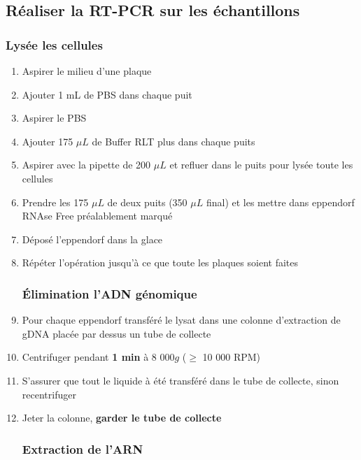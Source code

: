 \subsection{Réaliser la RT-PCR sur les échantillons}

\textbf{\color{red}{Une fois les cellules lysées, toutes les étapes doivent être réaliser le plus que possible dans la glace.}}

\subsubsection{Lysée les cellules}

\begin{enumerate}
\item Aspirer le milieu d'une plaque
\item Ajouter 1 mL de PBS dans chaque puit
\item Aspirer le PBS
\item Ajouter 175 $\mu L$ de Buffer RLT plus dans chaque puits
\item Aspirer avec la pipette de 200 $\mu L$ et refluer dans le puits pour lysée toute les cellules
\item Prendre les 175 $\mu L$ de deux puits (350 $\mu L$ final) et les mettre dans eppendorf RNAse Free préalablement marqué \label{volume-rlt}
\item Déposé l'eppendorf dans la glace
\item Répéter l'opération jusqu'à ce que toute les plaques soient faites


\subsubsection{Élimination l'ADN génomique}

\item Pour chaque eppendorf transféré le lysat dans une colonne d'extraction de gDNA placée par dessus un tube de collecte
\item Centrifuger pendant  \textbf{1 min} à 8 000$g$ ($\geq$ 10 000 RPM)
\item S'assurer que tout le liquide à été transféré dans le tube de collecte, sinon recentrifuger
\item Jeter la colonne, \textbf{garder le tube de collecte} 

\subsubsection{Extraction de l'ARN}


\end{enumerate}
